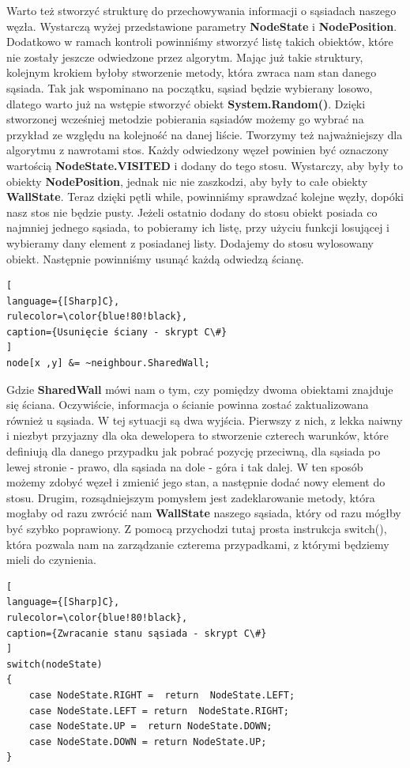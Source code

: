\documentclass[oneside,polski,logo]{amuthesis}
\begin{document}
Warto też stworzyć strukturę do przechowywania informacji o sąsiadach naszego węzła. Wystarczą wyżej przedstawione parametry \textbf{NodeState} i \textbf{NodePosition}. Dodatkowo w ramach kontroli powinniśmy stworzyć listę takich obiektów, które nie zostały jeszcze odwiedzone przez algorytm. Mając już takie struktury, kolejnym krokiem byłoby stworzenie metody, która zwraca nam stan danego sąsiada. Tak jak wspominano na początku, sąsiad będzie wybierany losowo, dlatego warto już na wstępie stworzyć obiekt \textbf{System.Random()}. Dzięki stworzonej wcześniej metodzie pobierania sąsiadów możemy go wybrać na przykład ze względu na kolejność na danej liście. Tworzymy też najważniejszy dla algorytmu z nawrotami stos. Każdy odwiedzony węzeł powinien być oznaczony wartością \textbf{NodeState.VISITED} i dodany do tego stosu. Wystarczy, aby były to obiekty \textbf{NodePosition}, jednak nic nie zaszkodzi, aby były to całe obiekty \textbf{WallState}. Teraz dzięki pętli while, powinniśmy sprawdzać kolejne węzły, dopóki nasz stos nie będzie pusty. Jeżeli ostatnio dodany do stosu obiekt posiada co najmniej jednego sąsiada, to pobieramy ich listę, przy użyciu funkcji losującej i wybieramy dany element z posiadanej listy. Dodajemy do stosu wylosowany obiekt.
Następnie powinniśmy usunąć każdą odwiedzą ścianę. 

\begin{lstlisting}[
language={[Sharp]C},
rulecolor=\color{blue!80!black},
caption={Usunięcie ściany - skrypt C\#}
]
node[x ,y] &= ~neighbour.SharedWall;
\end{lstlisting}

Gdzie \textbf{SharedWall} mówi nam o tym, czy pomiędzy dwoma obiektami znajduje się ściana. Oczywiście, informacja o ścianie powinna zostać zaktualizowana również u sąsiada. W tej sytuacji są dwa wyjścia. Pierwszy z nich, z lekka naiwny i niezbyt przyjazny dla oka dewelopera to stworzenie czterech warunków, które definiują dla danego przypadku jak pobrać pozycję przeciwną, dla sąsiada po lewej stronie - prawo, dla sąsiada na dole - góra i tak dalej. W ten sposób możemy zdobyć węzeł i zmienić jego stan, a następnie dodać nowy element do stosu. Drugim, rozsądniejszym pomysłem jest zadeklarowanie metody, która mogłaby od razu zwrócić nam \textbf{WallState} naszego sąsiada, który od razu mógłby być szybko poprawiony. Z pomocą przychodzi tutaj prosta instrukcja switch(), która pozwala nam na zarządzanie czterema przypadkami, z którymi będziemy mieli do czynienia.

\begin{lstlisting}[
language={[Sharp]C},
rulecolor=\color{blue!80!black},
caption={Zwracanie stanu sąsiada - skrypt C\#}
]
switch(nodeState)
{
	case NodeState.RIGHT =  return  NodeState.LEFT;
	case NodeState.LEFT = return  NodeState.RIGHT;
	case NodeState.UP =  return NodeState.DOWN;
	case NodeState.DOWN = return NodeState.UP;
}
\end{lstlisting}
\end{document}
